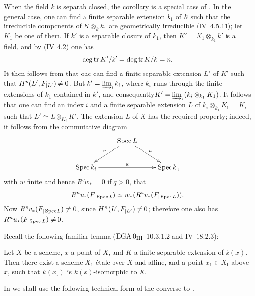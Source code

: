 When the field $k$ is separab closed, the corollary is a special case of . In the general case, one can find a finite separable extension $k_1$ of $k\sisi{'}{}$ such that the irreducible components of $K \otimes_k k_1$ are geometrically irreducible (\EGA IV~4.5.11); let $K_1$ be one of them. If $k'$ is a separable closure of $k_1$, then $K' = K_1 \otimes_{k_1} k'$ is a field, and by (\EGA IV~4.2) one has
$$
\deg \tr K'/k' = \deg \tr K/k = n.
$$
It then follows from  that one can find a finite separable extension $L'$ of $K'$ such that $H^n(L', \sisi{F{|L'}}{F_{|L'}}) \neq 0$. But $k' = \varinjlim_i k_i$, where $k_i$ runs through the finite extensions of $k_1$ contained in $k'$, and consequently\pageoriginale $K' = \varinjlim_i (k_i \otimes_{k_1} K_1)$. It follows that one can find an index $i$ and a finite separable extension $L$ of $k_i \otimes_{k_1} K_1 =K_i$ such that $L' \simeq L \otimes_{K_i} K'$. The extension $L$ of $K$ has the required property; indeed, it follows from the commutative diagram
$$
\xymatrix{
&{\Spec L}\ar[dl]_v\ar[dr]^u&\\
{\Spec k_i} \ar[rr]^w &{}&{\Spec k}\,,
}
$$
with $w$ finite and hence $R^q w_* = 0$ if $q>0$, that
$$R^n u_*(\sisi{F{|\Spec L}}{F_{|\Spec L}}) \simeq w_*(R^n v_*(\sisi{F{|\Spec L}}{F_{|\Spec L}})).
$$
Now $R^nv_*(\sisi{F{|\Spec L}}{F_{|\Spec L}}) \neq 0$, since $H^n(L', \sisi{F{|L'}}{F_{|L'}}) \neq 0$; therefore one also has $R^nu_*(\sisi{F{|\Spec L}}{F_{|\Spec L}}) \neq 0$.

Recall the following familiar lemma (\cf $\EGA 0_{\textup{III}}$~10.3.1.2 and \EGA IV~18.2.3):

\begin{lemme} \label{XIV.3.4}
Let $X$ be a scheme, $x$ a point of $X$, and $K$ a finite separable extension of $k(x)$. Then there exist a scheme $X_1$ étale over $X$ and affine, and a point $x_1 \in X_1$ above $x$, such that $k(x_1)$ is $k(x)$-isomorphic to $K$.
\end{lemme}

In \numero {} we shall use the following technical form of the converse to .


